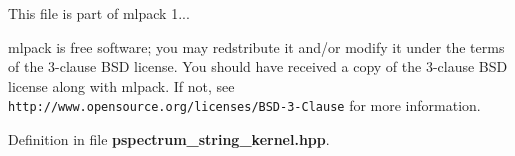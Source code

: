 This file is part of mlpack 1...

mlpack is free software; you may redstribute it and/or modify it under the terms of the 3-\/clause B\-S\-D license. You should have received a copy of the 3-\/clause B\-S\-D license along with mlpack. If not, see {\tt http\-://www.\-opensource.\-org/licenses/\-B\-S\-D-\/3-\/\-Clause} for more information. 

Definition in file {\bf pspectrum\-\_\-string\-\_\-kernel.\-hpp}.


